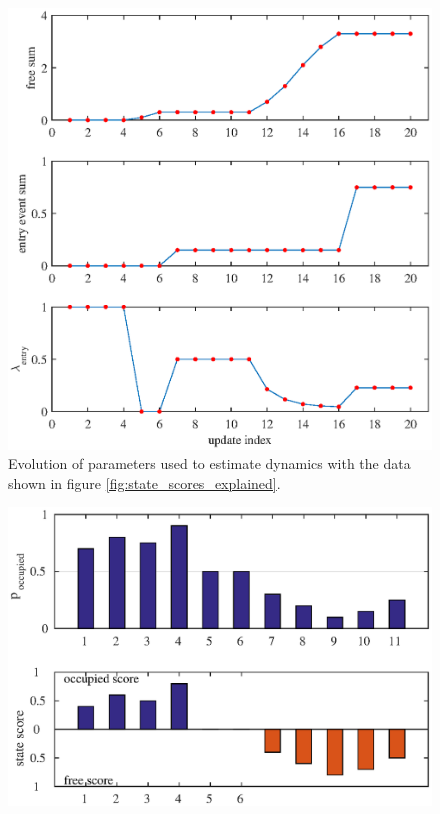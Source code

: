 \begin{figure}[htbp]
    \centering
    \includegraphics[scale=1]{chapters/mapping_of_dynamic_areas/figures/pmac_entry_explained}
    \caption{Evolution of parameters used to estimate dynamics with the data shown in figure \ref{fig:state_scores_explained}.}
    \label{fig:pmac_entry_explained}
\end{figure}


\begin{figure}[htbp]
\centering
\includegraphics[scale=1]{chapters/mapping_of_dynamic_areas/figures/pmac_noise_problem_case}
\caption{}
\label{fig:pmac_noise_problem_case}
\end{figure}


